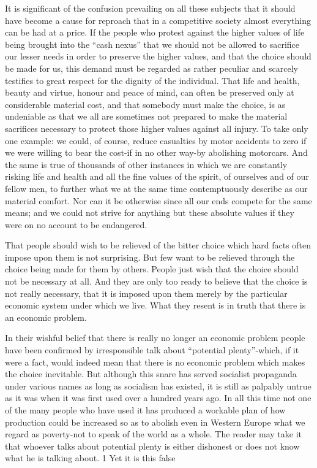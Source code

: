 \documentclass[11pt,openany]{book}
\begin{document}
It is significant of the confusion prevailing on all these subjects that it should have become a cause for reproach that in a competitive society almost everything can be had at a price. If the people who protest against the higher values of life being brought into the ``cash nexus'' that we should not be allowed to sacrifice our lesser needs in order to preserve the higher values, and that the choice should be made for us, this demand must be regarded as rather peculiar and scarcely testifies to great respect for the dignity of the individual. That life and health, beauty and virtue, honour and peace of mind, can often be preserved only at considerable material cost, and that somebody must make the choice, is as undeniable as that we all are sometimes not prepared to make the material sacrifices necessary to protect those higher values against all injury. To take only one example: we could, of course, reduce casualties by motor accidents to zero if we were willing to bear the cost-if in no other way-by abolishing motorcars. And the same is true of thousands of other instances in which we are constantly risking life and health and all the fine values of the spirit, of ourselves and of our fellow men, to further what we at the same time contemptuously describe as our material comfort. Nor can it be otherwise since all our ends compete for the same means; and we could not strive for anything but these absolute values if they were on no account to be endangered.

That people should wish to be relieved of the bitter choice which hard facts often impose upon them is not surprising. But few want to be relieved through the choice being made for them by others. People just wish that the choice should not be necessary at all. And they are only too ready to believe that the choice is not really necessary, that it is imposed upon them merely by the particular economic system under which we live. What they resent is in truth that there is an economic problem.

In their wishful belief that there is really no longer an economic problem people have been confirmed by irresponsible talk about ``potential plenty''-which, if it were a fact, would indeed mean that there is no economic problem which makes the choice inevitable. But although this snare has served socialist propaganda under various names as long as socialism has existed, it is still as palpably untrue as it was when it was first used over a hundred years ago. In all this time not one of the many people who have used it has produced a workable plan of how production could be increased so as to abolish even in Western Europe what we regard as poverty-not to speak of the world as a whole. The reader may take it that whoever talks about potential plenty is either dishonest or does not know what he is talking about. 1 Yet it is this false
\end{document}

